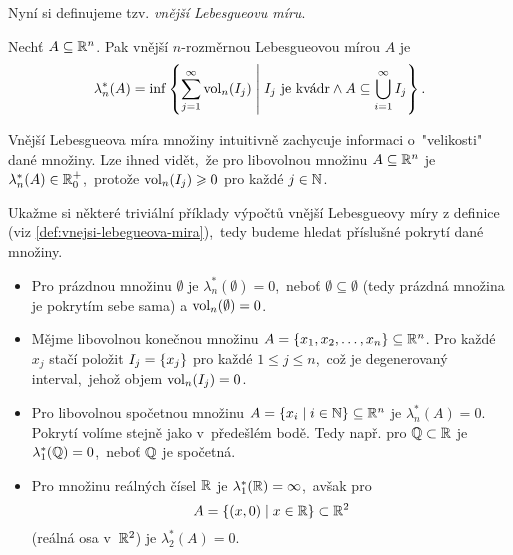 Nyní si definujeme tzv. \emph{vnější Lebesgueovu míru}.
\begin{definition}\label{def:vnejsi-lebegueova-mira}
    Nechť $A\subseteq\mathbb{R}^n$. Pak vnější $n$-rozměr\-nou Lebesgueovou mírou $A$ je
    \[\lambda_n^*(A)=\inf\left\{\sum_{j=1}^{\infty}\operatorname{vol}_n(I_j)\;\middle|\;\text{$I_j$ je kvádr}\land A\subseteq\bigcup_{i=1}^\infty I_j\right\}.\]
\end{definition}
Vnější Lebesgueova míra množiny intuitivně zachycuje informaci o~"velikosti" dané množiny.  Lze ihned vidět,~že pro libovolnou množinu $A\subseteq\mathbb{R}^n$ je $\lambda_n^*(A)\in\mathbb{R}_0^+$,~protože $\operatorname{vol}_n(I_j)\geqslant0$ pro každé $j\in\mathbb{N}$.
\begin{example}\label{ex:lebegueova-mira-trivialni-priklady}
    Ukažme si některé triviální příklady výpočtů vnější Lebesgueovy míry z definice (viz \ref{def:vnejsi-lebegueova-mira}),~tedy budeme hledat příslušné pokrytí dané množiny.
    \begin{itemize}
        \item Pro prázdnou množinu $\emptyset$ je $\lambda_n^*(\emptyset)=0$,~neboť $\emptyset\subseteq\emptyset$ (tedy prázdná množina je pokrytím sebe sama) a $\operatorname{vol}_n(\emptyset)=0$.
        \item Mějme libovolnou konečnou množinu $A=\left\{x_1,x_2,\dots,x_n\right\}\subseteq\mathbb{R}^n$. Pro každé $x_j$ stačí položit $I_j=\left\{x_j\right\}$ pro každé $1\leqslant j\leqslant n$,~což je degenerovaný interval,~jehož objem $\operatorname{vol}_n(I_j)=0$.
        \item Pro libovolnou spočetnou množinu $A=\left\{x_i\mid i\in\mathbb{N}\right\}\subseteq\mathbb{R}^n$ je $\lambda_n^*(A)=0$. Pokrytí volíme stejně jako v~předešlém bodě. Tedy např. pro $\mathbb{Q}\subset\mathbb{R}$ je $\lambda_1^*(\mathbb{Q})=0$,~neboť $\mathbb{Q}$ je spočetná.
        \item Pro množinu reálných čísel $\mathbb{R}$ je $\lambda_1^*(\mathbb{R})=\infty$,~avšak pro 
        \[A=\left\{(x,0)\mid x\in\mathbb{R}\right\}\subset\mathbb{R}^2\]
        (reálná osa v~$\mathbb{R}^2$) je $\lambda_2^*(A)=0$.
    \end{itemize}
\end{example}
